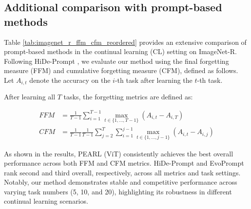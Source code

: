 \documentclass[10pt]{article} %
\begin{document}
\begin{table}[htbp]
\caption{Following \cite{10658306}, we compare additional adapter-based methods in the Class-IL setting on ImageNet-R (10T) using a ViT-B/16 backbone pre-trained on ImageNet-21K.}
\centering
\label{tab:method_comparison_vit_imagenetr}
\end{table}

\subsection{Additional comparison with prompt-based methods}

Table \ref{tab:imagenet_r_ffm_cfm_reordered} provides an extensive comparison of prompt-based methods in the continual learning (CL) setting on ImageNet-R. Following HiDe-Prompt \citep{wang2023hide}, we evaluate our method using the final forgetting measure (FFM) and cumulative forgetting measure (CFM), defined as follows. Let $A_{i,t}$ denote the accuracy on the $i$-th task after learning the $t$-th task.

After learning all $T$ tasks, the forgetting metrics are defined as:

\begin{align}
FFM &= \frac{1}{T - 1} \sum_{i=1}^{T-1} \max_{t \in \{1, \ldots, T-1\}} (A_{i,t} - A_{i,T}) \tag{A58} \\
CFM &= \frac{1}{T - 1}  \frac{1}{T - 1} \sum_{j=2}^{T} \sum_{i=1}^{j-1} \max_{t \in \{1, \ldots, j-1\}} (A_{i,t} - A_{i,j}) \tag{A59}
\end{align}

As shown in the results, PEARL (ViT) consistently achieves the best overall performance across both FFM and CFM metrics. HiDe-Prompt and EvoPrompt rank second and third overall, respectively, across all metrics and task settings. Notably, our method demonstrates stable and competitive performance across varying task numbers (5, 10, and 20), highlighting its robustness in different continual learning scenarios.
\end{document}
